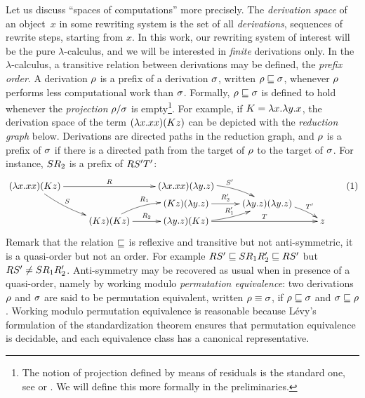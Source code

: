 Let us discuss ``spaces of computations'' more precisely.
The \emph{derivation space} of an object~$x$ in some rewriting system
is the set of all {\em derivations}, \ie sequences of rewrite steps, starting from $x$.
In this work, our rewriting system of interest will be the pure $\lambda$-calculus,
and we will be interested in \emph{finite} derivations only.
In the $\lambda$-calculus,
a transitive relation between derivations may be defined, the {\em prefix order}.
A derivation $\rho$ is a prefix of a derivation $\sigma$,
written $\rho \sqsubseteq \sigma$,
whenever $\rho$ performs less computational work than $\sigma$.
Formally, $\rho \sqsubseteq \sigma$ is defined to hold whenever the {\em projection} $\rho/\sigma$ 
is empty\footnote{The notion of projection defined by means of residuals
is the standard one, see \eg \cite[Chapter~12]{Barendregt:1984}
or \cite[Section~8.7]{Terese}.
We will define this more formally in the preliminaries.}.
For example, if $K = \lambda x. \lambda y. x$,
the derivation space of the term $(\lambda x. xx)(Kz)$
can be depicted with the \emph{reduction graph} below.
Derivations are directed paths in the reduction graph,
and $\rho$ is a prefix of $\sigma$ if there is a directed path from the
target of $\rho$ to the target of $\sigma$.
For instance, $SR_2$ is a prefix of $RS'T'$:
\[
  \xymatrix@R=.1cm{
    (\lam{\var}{\var\var})(K\varthree)
      \ar^-{\redex}[rr]
      \ar@/_.2cm/^-{\redextwo}[rdd]
  &
  &
    (\lam{\var}{\var\var})(\lam{\vartwo}{\varthree})
    \ar@/^.3cm/[rd]^{\redextwo'}
  &
  \\
  &
  &
    (K\varthree)(\lam{\vartwo}{\varthree}) \ar[r]^-{\redex'_2}
  &
    (\lam{\vartwo}{\varthree})(\lam{\vartwo}{\varthree})
    \ar@/^.2cm/[rd]^-{\redexthree'}
  \\
  &
    (K\varthree)(K\varthree) \ar@/^.3cm/[ru]^{\redex_1} \ar[r]^-{\redex_2}
  &
    (\lam{\vartwo}{\varthree})(K\varthree)
      \ar@/_.2cm/[ru]^-{\redex'_1}
      \ar[rr]^-{\redexthree}
  &
  &
    \varthree
  }
  \tag{1} \label{eq:redgraph}
\]
Remark that the relation $\sqsubseteq$ is reflexive and transitive but not anti-symmetric,
\ie it is a quasi-order but not an order.
For example $RS' \sqsubseteq SR_1R_2' \sqsubseteq RS'$
but $RS' \neq  SR_1R_2'$.
Anti-symmetry may be recovered as usual when in presence of a quasi-order,
namely by working modulo {\em permutation equivalence}:
two derivations $\rho$ and $\sigma$
are said to be permutation equivalent,
written $\rho \equiv \sigma$, if $\rho \sqsubseteq \sigma$
and $\sigma \sqsubseteq \rho$.
Working modulo permutation equivalence is reasonable because L\'evy's formulation
of the standardization theorem ensures that permutation equivalence is decidable,
and each equivalence class has a canonical representative.


